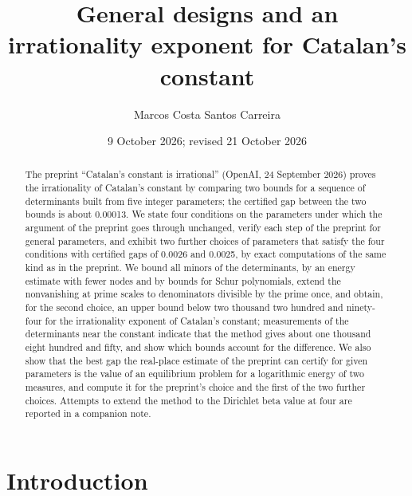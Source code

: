 \documentclass[11pt]{article}
\title{General designs and an irrationality exponent for Catalan's constant}
\author{Marcos Costa Santos Carreira}
\date{9 October 2026; revised 21 October 2026}
\theoremstyle{definition}
\begin{document}
\maketitle

\begin{abstract}
The preprint ``Catalan's constant is irrational'' (OpenAI, 24 September 2026) proves the irrationality of Catalan's constant by comparing two bounds for a sequence of determinants built from five integer parameters; the certified gap between the two bounds is about 0.00013. We state four conditions on the parameters under which the argument of the preprint goes through unchanged, verify each step of the preprint for general parameters, and exhibit two further choices of parameters that satisfy the four conditions with certified gaps of 0.0026 and 0.0025, by exact computations of the same kind as in the preprint. We bound all minors of the determinants, by an energy estimate with fewer nodes and by bounds for Schur polynomials, extend the nonvanishing at prime scales to denominators divisible by the prime once, and obtain, for the second choice, an upper bound below two thousand two hundred and ninety-four for the irrationality exponent of Catalan's constant; measurements of the determinants near the constant indicate that the method gives about one thousand eight hundred and fifty, and show which bounds account for the difference. We also show that the best gap the real-place estimate of the preprint can certify for given parameters is the value of an equilibrium problem for a logarithmic energy of two measures, and compute it for the preprint's choice and the first of the two further choices. Attempts to extend the method to the Dirichlet beta value at four are reported in a companion note.
\end{abstract}

\section{Introduction}
\end{document}

